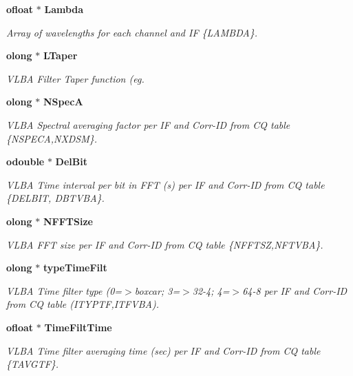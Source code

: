 \begin{CompactItemize}
{\bf ofloat} $\ast$ {\bf Lambda}
\begin{CompactList}\small\item\em Array of wavelengths for each channel and IF \{LAMBDA\}. \item\end{CompactList}\item 
{\bf olong} $\ast$ {\bf LTaper}
\begin{CompactList}\small\item\em VLBA Filter Taper function (eg. \item\end{CompactList}\item 
{\bf olong} $\ast$ {\bf NSpec\-A}
\begin{CompactList}\small\item\em VLBA Spectral averaging factor per IF and Corr-ID from CQ table \{NSPECA,NXDSM\}. \item\end{CompactList}\item 
{\bf odouble} $\ast$ {\bf Del\-Bit}
\begin{CompactList}\small\item\em VLBA Time interval per bit in FFT (s) per IF and Corr-ID from CQ table \{DELBIT, DBTVBA\}. \item\end{CompactList}\item 
{\bf olong} $\ast$ {\bf NFFTSize}
\begin{CompactList}\small\item\em VLBA FFT size per IF and Corr-ID from CQ table \{NFFTSZ,NFTVBA\}. \item\end{CompactList}\item 
{\bf olong} $\ast$ {\bf type\-Time\-Filt}
\begin{CompactList}\small\item\em VLBA Time filter type (0=$>$boxcar; 3=$>$32-4; 4=$>$64-8 per IF and Corr-ID from CQ table (ITYPTF,ITFVBA). \item\end{CompactList}\item 
{\bf ofloat} $\ast$ {\bf Time\-Filt\-Time}
\begin{CompactList}\small\item\em VLBA Time filter averaging time (sec) per IF and Corr-ID from CQ table \{TAVGTF\}. \item\end{CompactList}\item 

\end{CompactItemize}
